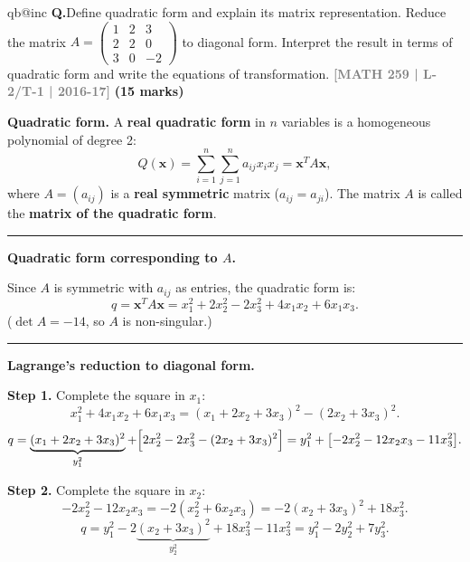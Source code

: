 \documentclass[12pt,a3paper]{article}
\makeatletter
\newcommand{\yr}[1]{\hfill\textcolor{gray}{\small\textbf{[#1]}}}
\newcommand{\mk}[1]{\textcolor{orange!70!black}{\small\textbf{(#1 marks)}}}
\newcounter{qnum}
\newcommand{\Q}[1]{%
  \csname qb@inc\endcsname
  \needspace{4\baselineskip}
  \refstepcounter{qnum}
  \vspace{6pt}
  \noindent\textbf{Q\theqnum.}\enspace #1\par
}
\makeatother
\begin{document}
\Q{Define quadratic form and explain its matrix representation. Reduce the matrix $A = \begin{pmatrix} 1 & 2 & 3 \\ 2 & 2 & 0 \\ 3 & 0 & -2 \end{pmatrix}$ to diagonal form. Interpret the result in terms of quadratic form and write the equations of transformation.
\yr{MATH 259 | L-2/T-1 | 2016-17} \mk{15}}

\begin{tcolorbox}[enhanced,breakable,
  colback=cE!4,colframe=cE,boxrule=0.8pt,arc=5pt,
  title={\textbf{Answer --- Quadratic Form Definition \& Diagonal Reduction of
    $A=\begin{pmatrix}1&2&3\\2&2&0\\3&0&-2\end{pmatrix}$}},
  fonttitle=\bfseries\color{white},colbacktitle=cE]

\textbf{Quadratic form.}
A \textbf{real quadratic form} in $n$ variables is a homogeneous polynomial of
degree 2:
\[
  Q(\mathbf{x}) = \sum_{i=1}^{n}\sum_{j=1}^{n} a_{ij} x_i x_j
               = \mathbf{x}^T A \mathbf{x},
\]
where $A = (a_{ij})$ is a \textbf{real symmetric} matrix ($a_{ij} = a_{ji}$).
The matrix $A$ is called the \textbf{matrix of the quadratic form}.

\medskip\textcolor{cE}{\rule{\textwidth}{0.4pt}}

\textbf{Quadratic form corresponding to $A$.}

Since $A$ is symmetric with $a_{ij}$ as entries, the quadratic form is:
\[
  q = \mathbf{x}^T A \mathbf{x}
  = x_1^2 + 2x_2^2 - 2x_3^2 + 4x_1 x_2 + 6x_1 x_3.
\]
($\det A = -14$, so $A$ is non-singular.)

\medskip\textcolor{cE}{\rule{\textwidth}{0.4pt}}

\textbf{Lagrange's reduction to diagonal form.}

\textbf{Step 1.} Complete the square in $x_1$:
\[
  x_1^2 + 4x_1 x_2 + 6x_1 x_3
  = (x_1 + 2x_2 + 3x_3)^2 - (2x_2+3x_3)^2.
\]
\[
  q = \underbrace{(x_1+2x_2+3x_3)^2}_{y_1^2}
    + \Bigl[2x_2^2-2x_3^2-(2x_2+3x_3)^2\Bigr]
  = y_1^2 + \bigl[-2x_2^2 - 12x_2 x_3 - 11x_3^2\bigr].
\]

\textbf{Step 2.} Complete the square in $x_2$:
\[
  -2x_2^2 - 12x_2 x_3
  = -2(x_2^2 + 6x_2 x_3)
  = -2(x_2+3x_3)^2 + 18x_3^2.
\]
\[
  q = y_1^2 - 2\underbrace{(x_2+3x_3)^2}_{y_2^2} + 18x_3^2 - 11x_3^2
  = y_1^2 - 2y_2^2 + 7y_3^2.
\]


\end{tcolorbox}
\end{document}
